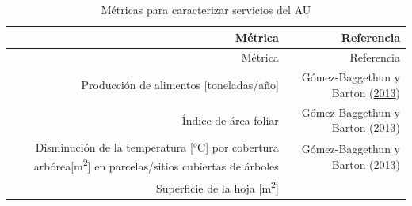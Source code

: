 \documentclass[12pt,a4paper,openany]{book}
\theoremstyle{definition}
\theoremstyle{definition}
\theoremstyle{definition}
\theoremstyle{remark}
\begin{document}
\begin{longtable}[]{@{}rr@{}}
\caption{\label{tab:ind-AU} Métricas para caracterizar servicios del
AU}\tabularnewline
\toprule
\begin{minipage}[b]{0.57\columnwidth}\raggedleft\strut
Métrica\strut
\end{minipage} & \begin{minipage}[b]{0.31\columnwidth}\raggedleft\strut
Referencia\strut
\end{minipage}\tabularnewline
\midrule
\endfirsthead
\toprule
\begin{minipage}[b]{0.57\columnwidth}\raggedleft\strut
Métrica\strut
\end{minipage} & \begin{minipage}[b]{0.31\columnwidth}\raggedleft\strut
Referencia\strut
\end{minipage}\tabularnewline
\midrule
\endhead
\begin{minipage}[t]{0.57\columnwidth}\raggedleft\strut
Producción de alimentos {[}toneladas/año{]}\strut
\end{minipage} & \begin{minipage}[t]{0.31\columnwidth}\raggedleft\strut
Gómez-Baggethun y Barton
(\protect\hyperlink{ref-gomez-baggethun_classifying_2013}{2013})\strut
\end{minipage}\tabularnewline
\begin{minipage}[t]{0.57\columnwidth}\raggedleft\strut
Índice de área foliar\strut
\end{minipage} & \begin{minipage}[t]{0.31\columnwidth}\raggedleft\strut
Gómez-Baggethun y Barton
(\protect\hyperlink{ref-gomez-baggethun_classifying_2013}{2013})\strut
\end{minipage}\tabularnewline
\begin{minipage}[t]{0.57\columnwidth}\raggedleft\strut
Disminución de la temperatura {[}°C{]} por cobertura
arbórea{[}m\textsuperscript{2}{]} en parcelas/sitios cubiertas de
árboles\strut
\end{minipage} & \begin{minipage}[t]{0.31\columnwidth}\raggedleft\strut
Gómez-Baggethun y Barton
(\protect\hyperlink{ref-gomez-baggethun_classifying_2013}{2013})\strut
\end{minipage}\tabularnewline
\begin{minipage}[t]{0.57\columnwidth}\raggedleft\strut
Superficie de la hoja {[}m\textsuperscript{2}{]}\strut
\end{minipage} & \begin{minipage}[t]{0.31\columnwidth}\raggedleft\strut

\end{minipage}
\end{longtable}
\end{document}
